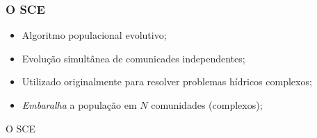 \documentclass[10pt,xcolor=table,fleqn]{beamer}
\newcommand{\mytitle}[1]{
  \begin{center}
    \color{defblue}
    { \LARGE #1 }
  \end{center}
}
\begin{document}
\begin{frame}
	\frametitle{O SCE}
  \begin{itemize}
    \item{ Algoritmo populacional evolutivo; }
    \item{ Evolução simultânea de comunicades independentes; }
    \item{ Utilizado originalmente para resolver problemas hídricos complexos; }
    \item{ \textit{Embaralha} a população em $N$ comunidades (complexos); }
  \end{itemize}
\end{frame}

\begin{frame}
	\mytitle{O SCE}
  \vspace{-5mm}
  \begin{figure}
    \centering
    \hspace{4mm}
    \begin{minipage}[b]{0.36\textwidth}

\end{minipage}
\end{figure}
\end{frame}
\end{document}
